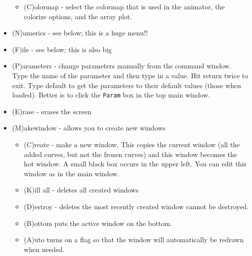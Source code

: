 \documentclass{article}
\begin{document}
\begin{itemize}
\begin{itemize}
\item (C)olormap - select the colormap that is used in the animator, the colorize options, and the array plot.
\end{itemize}
\item (N)umerics - see below; this is a huge menu!!
\item (F)ile - see below; this is also big
\item (P)arameters - change parameters manually from the command window. Type the name of the parameter and then type in a value. Hit return twice to exit. Type default to get the parameters to their default values (those when loaded). Better is to click the {\tt Param} box in the top main window. 
\item (E)rase - erases the screen
\item (M)akewindow - allows you to create new windows
\begin{itemize}
\item (C)reate - make a new window. This copies the current window (all the added curves, but not the frozen curves) and this window becomes the hot window. A small black box occurs in the upper left. You can edit this window as in the main window. 
\item (K)ill all - deletes all created windows
\item (D)estroy - deletes the most recently created window
 cannot be destroyed.  
\item (B)ottom puts the active window on the bottom. 
\item (A)uto turns on a flag so that the window will automatically be
redrawn when needed.


\end{itemize}
\end{itemize}
\end{document}
